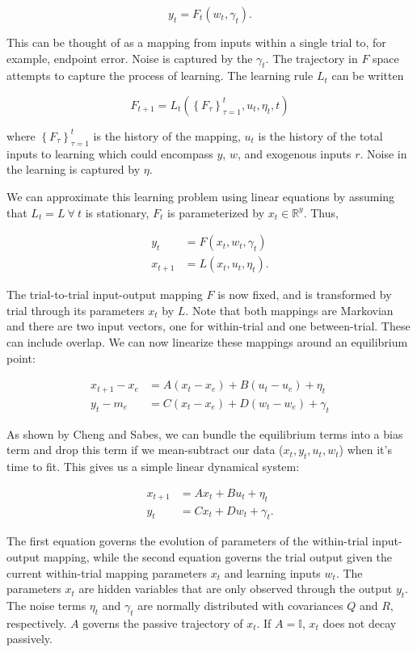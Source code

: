 \documentclass[../main.tex]{subfiles}
\begin{document}
{{{$$
y_t = F_t(w_t, \gamma_t).
$$

This can be thought of as a mapping from inputs within a single trial to, for example, endpoint error. Noise is captured by the $\gamma_t$. The trajectory in $F$ space attempts to capture the process of learning. The learning rule $L_t$ can be written

$$F_{t+1} = L_t\left(\left\{F_\tau\right\}_{\tau=1}^{t}, u_t, \eta_t, t\right)$$

where $\left\{F_\tau\right\}_{\tau=1}^{t}$ is the history of the mapping, $u_t$ is the history of the total inputs to learning which could encompass $y$, $w$, and exogenous inputs $r$. Noise in the learning is captured by $\eta$.

We can approximate this learning problem using linear equations by assuming that $L_t=L \ \forall \ t$ is stationary, $F_t$ is parameterized by $x_t\in\mathbb{R}^y$. Thus,

$$
\begin{aligned}
y_t &= F(x_t, w_t, \gamma_t) \\
x_{t+1} &= L(x_t, u_t, \eta_t).
\end{aligned}
$$

The trial-to-trial input-output mapping $F$ is now fixed, and is transformed by trial through its parameters $x_t$ by $L$. Note that both mappings are Markovian and there are two input vectors, one for within-trial and one between-trial. These can include overlap. We can now linearize these mappings around an equilibrium point:

$$
\begin{aligned}
x_{t+1} - x_e &= A(x_t-x_e) + B(u_t-u_e) + \eta_t \\
y_t - m_e &= C(x_t-x_e) + D(w_t-w_e) + \gamma_t
\end{aligned}
$$

As shown by Cheng and Sabes, we can bundle the equilibrium terms into a bias term and drop this term if we mean-subtract our data ($x_t, y_t, u_t, w_t$) when it's time to fit. This gives us a simple linear dynamical system:

$$
\begin{aligned}
x_{t+1} &= Ax_t + Bu_t + \eta_t \\
y_t &= Cx_t + Dw_t + \gamma_t.
\end{aligned}
$$

The first equation governs the evolution of parameters of the within-trial input-output mapping, while the second equation governs the trial output given the current within-trial mapping parameters $x_t$ and learning inputs $w_t$. The parameters $x_t$ are hidden variables that are only observed through the output $y_t$. The noise terms $\eta_t$ and $\gamma_t$ are normally distributed with covariances $Q$ and $R$, respectively. $A$ governs the passive trajectory of $x_t$. If $A=\mathbb{I}$, $x_t$ does not decay passively.

}}}
\end{document}
